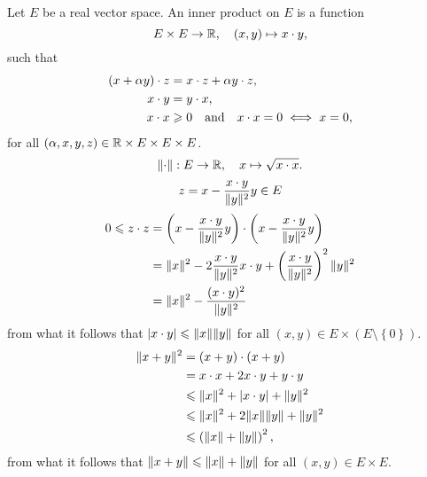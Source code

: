 \begin{example}
  Let \(E\) be a real vector space. An inner product on \(E\) is a function
  \[
    E\times{E}\to\mathbb{R},\quad(x,y)\mapsto{x}\cdot{y},
  \]
  such that
  \begin{align}
    {(x+\alpha{y})}\cdot{z} & = {x}\cdot{z}+\alpha{y}\cdot{z},                   \label{axiom:inner-product-01} \\
    {x}\cdot{y}             & = {y}\cdot{x},                                           \label{axiom:inner-product-02} \\
    {x}\cdot{x}             &   \geqslant{0}\quad\text{and}\quad{x}\cdot{x}=0\iff{x=0},\label{axiom:inner-product-03}
  \end{align}
  for all \((\alpha,x,y,z)\in\mathbb{R}\times{E}\times{E}\times{E}\).
  \[
    \norm:E\to\reals,\quad{x\mapsto{\sqrt{\scalarprod{x}{x}}}}.
  \]
  \begin{equation}
    z=x-\frac{\scalarprod{x}{y}}{\norm(y)^{2}}y\in{E}
  \end{equation}
  \begin{align*}
    0\leqslant\scalarprod{z}{z} & =\scalarprod{\left(x-\frac{\scalarprod{x}{y}}{\norm(y)^{2}}y\right)}{\left(x-\frac{\scalarprod{x}{y}}{\norm(y)^{2}}y\right)}               \\
                                & =\norm(x)^{2}-2\frac{\scalarprod{x}{y}}{\norm(y)^{2}}\scalarprod{x}{y}+\left(\frac{\scalarprod{x}{y}}{\norm(y)^{2}}\right)^{2}\norm(y)^{2} \\
                                & =\norm(x)^{2}-\frac{(\scalarprod{x}{y})^{2}}{\norm(y)^{2}}
  \end{align*}
  from what it follows that
  \(\abs{\scalarprod{x}{y}}\leqslant\norm(x)\norm(y)\) for all
  \((x,y)\in{E\times{(E\setminus\left\{0\right\})}}\).
  \begin{align*}
    \norm(x+y)^{2} & =\scalarprod{(x+y)}{(x+y)}                                   \\
                   & =\scalarprod{x}{x}+2\scalarprod{x}{y}+\scalarprod{y}{y}      \\
                   & \leqslant{\norm(x)^{2}+\abs{\scalarprod{x}{y}}+\norm(y)^{2}} \\
                   & \leqslant{\norm(x)^{2}+2\norm(x)\norm(y)+\norm(y)^{2}}       \\
                   & \leqslant\left(\norm(x)+\norm(y)\right)^{2},
  \end{align*}
  from what it follows that \(\norm(x+y)\leqslant{\norm(x)+\norm(y)}\) for all
  \((x,y)\in{E\times{E}}\).
\end{example}

